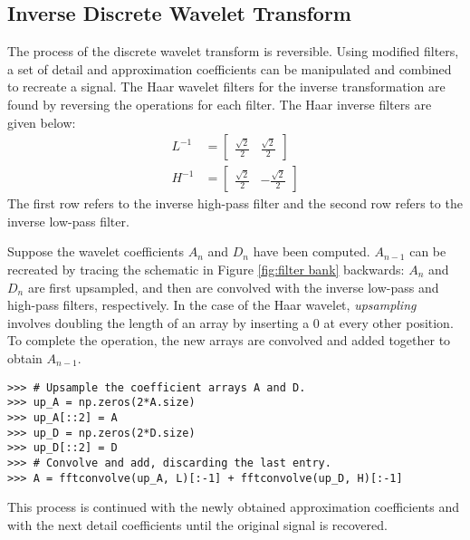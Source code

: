 \subsection*{Inverse Discrete Wavelet Transform}

The process of the discrete wavelet transform is reversible.
Using modified filters, a set of detail and approximation coefficients can be manipulated and combined to recreate a signal.
The Haar wavelet filters for the inverse transformation are found by reversing the operations for each filter.
The Haar inverse filters are given below:
\begin{align*}
L^{-1} &= \begin{bmatrix}\frac{\sqrt{2}}{2} & \frac{\sqrt{2}}{2}\end{bmatrix}\\H^{-1}&=\begin{bmatrix}\frac{\sqrt{2}}{2}&-\frac{\sqrt{2}}{2}\end{bmatrix}
\end{align*}
The first row refers to the inverse high-pass filter and the second row refers to the inverse low-pass filter.

Suppose the wavelet coefficients $A_n$ and $D_n$ have been computed.
$A_{n-1}$ can be recreated by tracing the schematic in Figure \ref{fig:filter bank} backwards: $A_n$ and $D_n$ are first upsampled, and then are convolved with the inverse low-pass and high-pass filters, respectively.
In the case of the Haar wavelet, \emph{upsampling} involves doubling the length of an array by inserting a 0 at every other position.
To complete the operation, the new arrays are convolved and added together to obtain $A_{n-1}$.

\begin{lstlisting}
>>> # Upsample the coefficient arrays A and D.
>>> up_A = np.zeros(2*A.size)
>>> up_A[::2] = A
>>> up_D = np.zeros(2*D.size)
>>> up_D[::2] = D
>>> # Convolve and add, discarding the last entry.
>>> A = fftconvolve(up_A, L)[:-1] + fftconvolve(up_D, H)[:-1]
\end{lstlisting}

This process is continued with the newly obtained approximation coefficients and with the next detail coefficients until the original signal is recovered.

